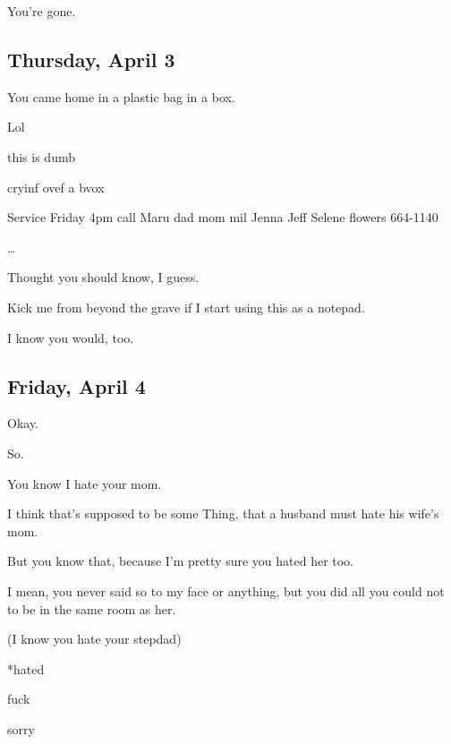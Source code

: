 {
You're gone.

\newpage

\subsection*{Thursday, April 3}\label{thursday-april-3}

You came home in a plastic bag in a
box.

Lol

this is dumb

cryinf ovef a bvox

Service Friday 4pm call Maru dad mom
mil Jenna Jeff Selene flowers 664-1140

\ldots{}

Thought you should know, I guess.

Kick me from beyond the grave if I
start using this as a notepad.

I know you would, too.

\newpage

\subsection*{Friday, April 4}\label{friday-april-4}

Okay.

So.

You know I hate your mom.

I think that's supposed to be some
Thing, that a husband must hate his wife's mom.

But you know that, because I'm
pretty sure you hated her too.

I mean, you never said so to my face
or anything, but you did all you could not to be in the same room as
her.

(I know you hate your stepdad)

*hated

fuck

sorry

}
